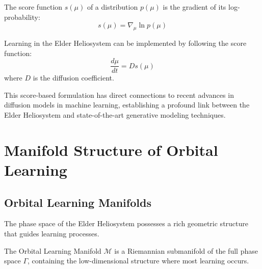 \begin{definition}
The score function $s(\mu)$ of a distribution $p(\mu)$ is the gradient of its log-probability:
\begin{equation}
s(\mu) = \nabla_{\mu} \ln p(\mu)
\end{equation}
\end{definition}

\begin{theorem}
Learning in the Elder Heliosystem can be implemented by following the score function:
\begin{equation}
\frac{d\mu}{dt} = D s(\mu)
\end{equation}
where $D$ is the diffusion coefficient.
\end{theorem}

This score-based formulation has direct connections to recent advances in diffusion models in machine learning, establishing a profound link between the Elder Heliosystem and state-of-the-art generative modeling techniques.

\section{Manifold Structure of Orbital Learning}

\subsection{Orbital Learning Manifolds}

The phase space of the Elder Heliosystem possesses a rich geometric structure that guides learning processes.

\begin{definition}
The Orbital Learning Manifold $\mathcal{M}$ is a Riemannian submanifold of the full phase space $\Gamma$, containing the low-dimensional structure where most learning occurs.
\end{definition}

